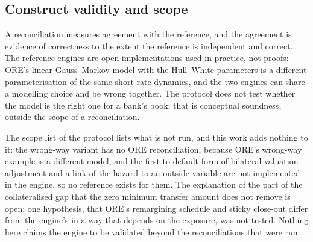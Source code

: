 \subsection{Construct validity and scope}
\label{sec:limits-construct}

A reconciliation measures agreement with the reference, and the agreement is evidence of correctness to the extent the reference is independent and correct. The reference engines are open implementations used in practice, not proofs: ORE's linear Gauss--Markov model with the Hull--White parameters is a different parameterisation of the same short-rate dynamics, and the two engines can share a modelling choice and be wrong together. The protocol does not test whether the model is the right one for a bank's book; that is conceptual soundness, outside the scope of a reconciliation.

The scope list of the protocol lists what is not run, and this work adds nothing to it: the wrong-way variant has no ORE reconciliation, because ORE's wrong-way example is a different model, and the first-to-default form of bilateral valuation adjustment and a link of the hazard to an outside variable are not implemented in the engine, so no reference exists for them. The explanation of the part of the collateralised gap that the zero minimum transfer amount does not remove is open; one hypothesis, that ORE's remargining schedule and sticky close-out differ from the engine's in a way that depends on the exposure, was not tested. Nothing here claims the engine to be validated beyond the reconciliations that were run.
